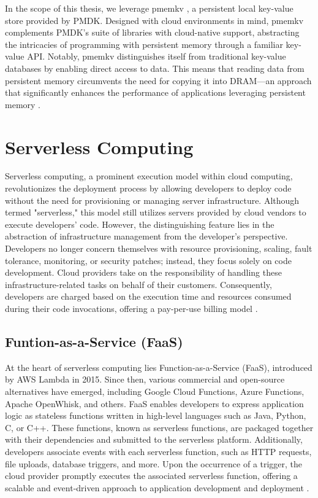 In the scope of this thesis, we leverage pmemkv \cite{GitHubpm66:online}, a persistent local key-value store provided by PMDK. Designed with cloud environments in mind, pmemkv complements PMDK's suite of libraries with cloud-native support, abstracting the intricacies of programming with persistent memory through a familiar key-value API. Notably, pmemkv distinguishes itself from traditional key-value databases by enabling direct access to data. This means that reading data from persistent memory circumvents the need for copying it into DRAM—an approach that significantly enhances the performance of applications leveraging persistent memory \cite{scargall2020pmem}.

\section{Serverless Computing}
Serverless computing, a prominent execution model within cloud computing, revolutionizes the deployment process by allowing developers to deploy code without the need for provisioning or managing server infrastructure. Although termed "serverless," this model still utilizes servers provided by cloud vendors to execute developers' code. However, the distinguishing feature lies in the abstraction of infrastructure management from the developer's perspective. Developers no longer concern themselves with resource provisioning, scaling, fault tolerance, monitoring, or security patches; instead, they focus solely on code development. Cloud providers take on the responsibility of handling these infrastructure-related tasks on behalf of their customers. Consequently, developers are charged based on the execution time and resources consumed during their code invocations, offering a pay-per-use billing model \cite{jonas2019cloud,romero2021faat,klimovic2018pocket}.

\subsection{Funtion-as-a-Service (FaaS)}
At the heart of serverless computing lies Function-as-a-Service (FaaS), introduced by AWS Lambda in 2015. Since then, various commercial and open-source alternatives have emerged, including Google Cloud Functions, Azure Functions, Apache OpenWhisk, and others. FaaS enables developers to express application logic as stateless functions written in high-level languages such as Java, Python, C, or C++. These functions, known as serverless functions, are packaged together with their dependencies and submitted to the serverless platform. Additionally, developers associate events with each serverless function, such as HTTP requests, file uploads, database triggers, and more. Upon the occurrence of a trigger, the cloud provider promptly executes the associated serverless function, offering a scalable and event-driven approach to application development and deployment \cite{AWSLambd40:online,AzureFun49:online,CloudFun3:online,ApacheOp28:online}.


